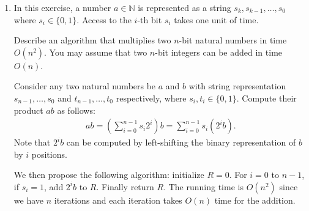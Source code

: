 \documentclass[11pt]{article}
\newcommand{\setN}{\mathbb{N}}
\begin{document}
\begin{enumerate}[1)]
\begin{solution}
We prove the statement by induction on $k∈\setN_0$ that $M^2_{2^k} = 2^kI_{2^k}$. For $k= 0$ one has $M^2_0 = M_1 =[1] = 2^0I_{2^0}$. Assume that the statement holds for $k$ and prove it for $k+ 1$. Then 


$$M^2_{2^{k+1}} = \begin{pmatrix} M_{2^{k}} &  M_{2^{k}} \\ M_{2^{k}} & −M_{2^{k}} \end{pmatrix} \begin{pmatrix} M_{2^{k}} &  M_{2^{k}} \\ M_{2^{k}} & −M_{2^{k}} \end{pmatrix} = \begin{pmatrix} 2M^2_{2^k} & 0  \\ 0 & 2M^2_{2^k} \end{pmatrix} = \begin{pmatrix} 2\cdot 2^k I_{2^k} & 0  \\ 0 & 2\cdot 2^k I_{2^k} \end{pmatrix} = 2^{k+1}I_{2^{k+1}}$$
where we have used the induction hypothesis in the second to last equality.
By using the statement above we have that $\det(M^2_n) = \det(n I_n) = n^n$ so $|\det(M_n)|= n^{n/2}.$
\end{solution}


\item In this exercise, a number $a ∈ ℕ$ is represented as a string $s_k,s_{k-1},\dots,s_0$ where $s_i ∈ \{0,1\}$. Access to the $i$-th bit $s_i$ takes one unit of time. 

Describe an algorithm that multiplies two $n$-bit natural numbers in time $O(n^2)$. You may assume that two $n$-bit integers can be added in time $O(n)$.  

\begin{solution}
Consider any two natural numbers be $a$ and $b$ with string representation $s_{n-1},\dots,s_0$ and $t_{n-1},\dots,t_0$ respectively, where $s_i, t_i \in \{0,1\}$. 
Compute their product $ab$ as follows:
\begin{align*}
ab = \left( \sum_{i=0}^{n-1} s_i 2^i \right) b = \sum_{i=0}^{n-1} s_i (2^i b).
\end{align*}
Note that $2^i b$ can be computed by left-shifting the binary representation of $b$ by $i$ positions.

We then propose the following algorithm: initialize $R = 0$. For $i=0$ to $n-1$, if $s_i = 1$, add $2^i b$ to $R$. Finally return $R$.
The running time is $O(n^2)$ since we have $n$ iterations and each iteration takes $O(n)$ time for the addition.
\end{solution}


\end{enumerate}
\end{document}
